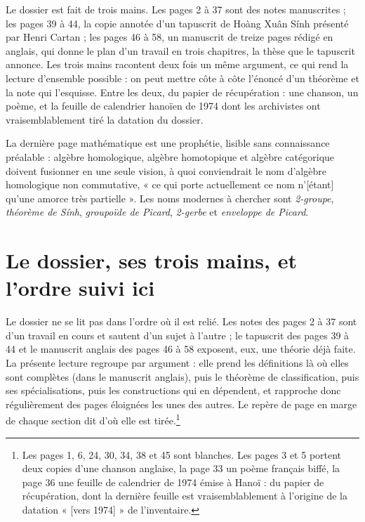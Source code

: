\documentclass[11pt,a4paper]{article}
\begin{document}
\begin{resume}
Le dossier est fait de trois mains. Les pages 2 à 37 sont des notes
manuscrites ; les pages 39 à 44, la copie annotée d'un tapuscrit de Hoàng Xuân
Sính présenté par Henri Cartan ; les pages 46 à 58, un manuscrit de treize
pages rédigé en anglais, qui donne le plan d'un travail en trois chapitres, la thèse que le tapuscrit annonce. Les trois mains
racontent deux fois un même argument, ce qui rend la lecture d'ensemble
possible : on peut mettre côte à côte l'énoncé d'un théorème et la note qui
l'esquisse. Entre les deux, du papier de récupération : une chanson, un poème,
et la feuille de calendrier hanoïen de 1974 dont les archivistes ont
vraisemblablement tiré la datation du dossier.

La dernière page mathématique est une prophétie, lisible sans
connaissance préalable : algèbre homologique, algèbre homotopique et algèbre
catégorique doivent fusionner en une seule vision, à quoi conviendrait le nom
d'algèbre homologique non commutative, « ce qui porte actuellement ce nom
n'[étant] qu'une amorce très partielle ». Les noms modernes à chercher sont
\emph{2-groupe}, \emph{théorème de Sính}, \emph{groupoïde de Picard},
\emph{2-gerbe} et \emph{enveloppe de Picard}.

\end{resume}

\section*{Le dossier, ses trois mains, et l'ordre suivi ici}

Le dossier ne se lit pas dans l'ordre où il est relié. Les notes des pages 2 à
37 sont d'un travail en cours et sautent d'un sujet à l'autre ; le tapuscrit
des pages 39 à 44 et le manuscrit anglais des pages 46 à 58 exposent, eux, une
théorie déjà faite. La présente lecture regroupe par argument : elle prend les
définitions là où elles sont complètes (dans le manuscrit anglais), puis le
théorème de classification, puis ses spécialisations, puis les constructions
qui en dépendent, et rapproche donc régulièrement des pages éloignées les unes
des autres. Le repère de page en marge de chaque section dit d'où elle est
tirée.\footnote{Les pages 1, 6, 24, 30, 34, 38 et 45 sont blanches. Les pages 3
et 5 portent deux copies d'une chanson anglaise, la page 33 un poème français
biffé, la page 36 une feuille de calendrier de 1974 émise à Hanoï : du papier de récupération, dont la dernière feuille est vraisemblablement à l'origine de
la datation « [vers 1974] » de l'inventaire.}
\end{document}
